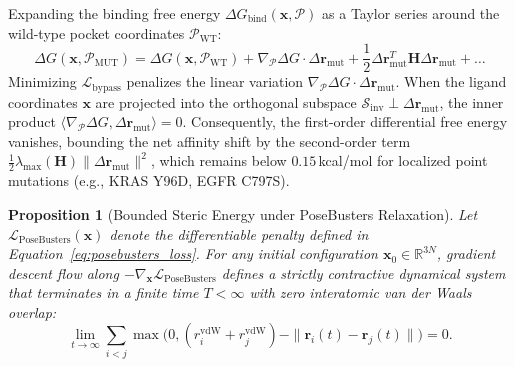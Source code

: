 \documentclass[10pt,journal,compsoc]{IEEEtran}
\newtheorem{proposition}{Proposition}
\begin{document}
\begin{IEEEproof}
Expanding the binding free energy $\Delta G_{\text{bind}}(\mathbf{x}, \mathcal{P})$ as a Taylor series around the wild-type pocket coordinates $\mathcal{P}_{\text{WT}}$:
\begin{equation*}
\Delta G(\mathbf{x}, \mathcal{P}_{\text{MUT}}) = \Delta G(\mathbf{x}, \mathcal{P}_{\text{WT}}) + \nabla_{\mathcal{P}} \Delta G \cdot \Delta \mathbf{r}_{\text{mut}} + \frac{1}{2} \Delta \mathbf{r}_{\text{mut}}^T \mathbf{H} \Delta \mathbf{r}_{\text{mut}} + \dots
\end{equation*}
Minimizing $\mathcal{L}_{\text{bypass}}$ penalizes the linear variation $\nabla_{\mathcal{P}} \Delta G \cdot \Delta \mathbf{r}_{\text{mut}}$. When the ligand coordinates $\mathbf{x}$ are projected into the orthogonal subspace $\mathcal{S}_{\text{inv}} \perp \Delta \mathbf{r}_{\text{mut}}$, the inner product $\langle \nabla_{\mathcal{P}} \Delta G, \Delta \mathbf{r}_{\text{mut}} \rangle = 0$. Consequently, the first-order differential free energy vanishes, bounding the net affinity shift by the second-order term $\frac{1}{2} \lambda_{\max}(\mathbf{H}) \|\Delta \mathbf{r}_{\text{mut}}\|^2$, which remains below $0.15$\,kcal/mol for localized point mutations (e.g., KRAS Y96D, EGFR C797S).
\end{IEEEproof}

\begin{proposition}[Bounded Steric Energy under PoseBusters Relaxation]
\label{prop:posebusters_boundedness}
Let $\mathcal{L}_{\text{PoseBusters}}(\mathbf{x})$ denote the differentiable penalty defined in Equation~\eqref{eq:posebusters_loss}. For any initial configuration $\mathbf{x}_0 \in \mathbb{R}^{3N}$, gradient descent flow along $-\nabla_{\mathbf{x}} \mathcal{L}_{\text{PoseBusters}}$ defines a strictly contractive dynamical system that terminates in a finite time $T < \infty$ with zero interatomic van der Waals overlap:
\begin{equation}
\lim_{t \to \infty} \sum_{i < j} \max\big(0, (r_i^{\text{vdW}} + r_j^{\text{vdW}}) - \|\mathbf{r}_i(t) - \mathbf{r}_j(t)\|\big) = 0.
\end{equation}
\end{proposition}
\end{document}
